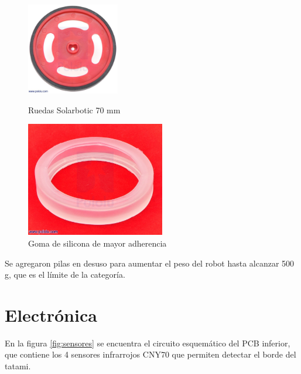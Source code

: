 \documentclass[12pt,a4paper]{article}
\begin{document}
\begin{figure}
\centering
\begin{minipage}{0.45\textwidth}
  \centering
  \includegraphics[height=4cm]{img/wheel}
  \vspace{-0.3cm}
  \caption{Ruedas Solarbotic 70 mm}
  \label{fig:ruedas}
\end{minipage}\hfill
\begin{minipage}{0.45\textwidth}
  \centering
  \includegraphics[height=5cm]{img/sticky}
  \vspace{-0.3cm}
  \caption{Goma de silicona de mayor adherencia}
  \label{fig:sticky}
\end{minipage}
\end{figure}

Se agregaron pilas en desuso para aumentar el peso del robot hasta alcanzar 500 g, que es el límite de la categoría. 

\section{Electrónica}

En la figura \ref{fig:sensores} se encuentra el circuito esquemático del PCB
inferior, que contiene los 4 sensores infrarrojos CNY70 que permiten detectar el
borde del tatami.
\end{document}
